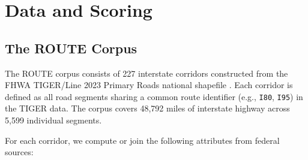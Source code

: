 \section{Data and Scoring}

\subsection{The ROUTE Corpus}

The ROUTE corpus consists of 227 interstate corridors constructed from the FHWA TIGER/Line 2023 Primary Roads national shapefile \citep{Census_TIGER2023}. Each corridor is defined as all road segments sharing a common route identifier (e.g., \texttt{I80}, \texttt{I95}) in the TIGER data. The corpus covers 48,792 miles of interstate highway across 5,599 individual segments.

For each corridor, we compute or join the following attributes from federal sources:

